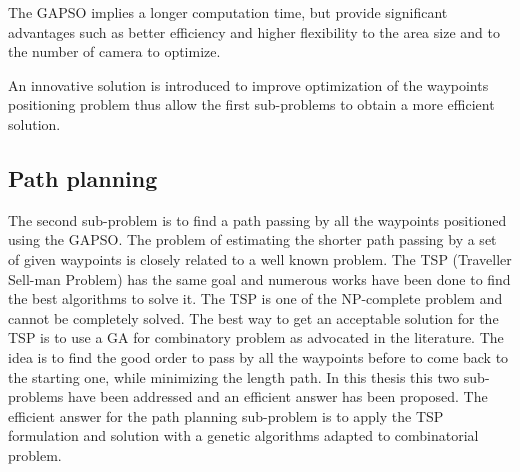 The GAPSO implies a longer computation time, but provide significant advantages such as better efficiency and higher flexibility to the area size and to the number of camera to optimize.

An innovative solution is introduced to improve optimization of the waypoints positioning problem thus allow the first sub-problems to obtain a more efficient solution.


\subsection{Path planning}
The second sub-problem is to find a path passing by all the waypoints positioned using the GAPSO. The problem of estimating the shorter path passing by a set of given waypoints is closely related to a well known problem. The TSP (Traveller Sell-man Problem) has the same goal and numerous works have been done to find the best algorithms to solve it. The TSP is one of the NP-complete problem and cannot be completely solved. The best way to get an acceptable solution for the TSP is to use a GA for combinatory problem as advocated in the literature. 
The idea is to find the good order to pass by all the waypoints before to come back to the starting one, while  minimizing the length path. 
In this thesis this two sub-problems have been addressed and an efficient answer has been proposed. The efficient answer for the path planning sub-problem is to apply the TSP formulation and solution with a genetic algorithms adapted to combinatorial problem.

